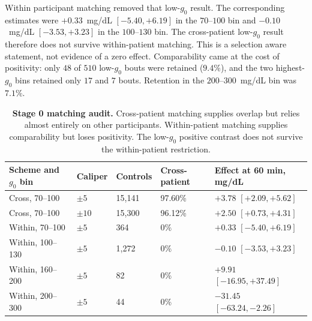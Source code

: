 Within participant matching removed that low-$g_0$ result. The corresponding
estimates were $+0.33$~mg/dL $[-5.40,+6.19]$ in the $70$--$100$ bin and
$-0.10$~mg/dL $[-3.53,+3.23]$ in the $100$--$130$ bin. The cross-patient
low-$g_0$ result therefore does not survive within-patient matching. This is
a selection aware statement, not evidence of a zero effect. Comparability
came at the cost of positivity: only $48$ of $510$ low-$g_0$ bouts were
retained ($9.4\%$), and the two highest-$g_0$ bins retained only $17$ and $7$
bouts. Retention in the $200$--$300$~mg/dL bin was $7.1\%$.

\begin{table}[H]
  \centering
  \caption{%
    \textbf{Stage 0 matching audit.}
    Cross-patient matching supplies overlap but relies almost entirely on
    other participants. Within-patient matching supplies comparability but
    loses positivity. The low-$g_0$ positive contrast does not survive the
    within-patient restriction.%
  }
  \label{tab:exercise_stage0}
  \small
  \setlength{\tabcolsep}{3pt}
  \begin{tabular}{lllll}
    \toprule
    Scheme and $g_0$ bin & Caliper & Controls & Cross-patient & Effect at 60 min, mg/dL \\
    \midrule
    Cross, 70--100   & $\pm5$  & 15{,}141 & 97.60\% & $+3.78$ $[+2.09,+5.62]$ \\
    Cross, 70--100   & $\pm10$ & 15{,}300 & 96.12\% & $+2.50$ $[+0.73,+4.31]$ \\
    Within, 70--100  & $\pm5$  & 364       & 0\%     & $+0.33$ $[-5.40,+6.19]$ \\
    Within, 100--130 & $\pm5$  & 1{,}272   & 0\%     & $-0.10$ $[-3.53,+3.23]$ \\
    Within, 160--200 & $\pm5$  & 82        & 0\%     & $+9.91$ $[-16.95,+37.49]$ \\
    Within, 200--300 & $\pm5$  & 44        & 0\%     & $-31.45$ $[-63.24,-2.26]$ \\
    \bottomrule
  \end{tabular}
\end{table}

